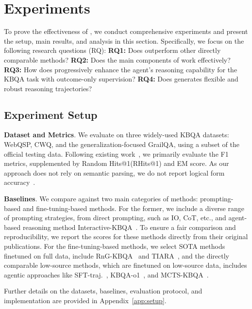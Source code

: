 \section{Experiments}\label{sec:experiment}

To prove the effectiveness of \ours, we conduct comprehensive experiments and present the setup, main results, and analysis in this section. Specifically, we focus on the following research questions (RQ): \textbf{RQ1:}
Does \ours \space outperform other directly comparable methods? \textbf{RQ2:} Does the main components of \ours \space work effectively? \textbf{RQ3:} How does \ours \space progressively enhance the agent's reasoning capability for the KBQA task with outcome-only supervision? \textbf{RQ4:} Does \ours \space generates flexible and robust reasoning trajectories?


\subsection{Experiment Setup}
\textbf{Dataset and Metrics}. We evaluate \ours \space on three widely-used KBQA datasets: WebQSP, CWQ, and the generalization-focused GrailQA, using a subset of the official testing data. Following existing work~\citep{xiong2024interactive}, we primarily evaluate the F1 metrics, supplemented by Random Hits@1(RHits@1) and EM score. As our approach does not rely on semantic parsing, we do not report logical form accuracy~\citep{gu2021beyond}. 

\textbf{Baselines}. We compare \ours \space against two main categories of methods: prompting-based and fine-tuning-based methods. For the former, we include a diverse range of prompting strategies, from direct prompting, such as IO, CoT, etc., and agent-based reasoning method Interactive-KBQA~\citep{xiong2024interactive}. To ensure a fair comparison and reproducibility, we report the scores for these methods directly from their original publications. For the fine-tuning-based methods, we select SOTA methods finetuned on full data, include RnG-KBQA~\citep{ye2022rng} and TIARA~\citep{shu2022tiara}, and the directly comparable low-source methods, which are finetuned on low-source data, includes agentic approaches like SFT-traj.~\citep{xiong2024interactive}, KBQA-o1~\citep{luokbqao1}, and MCTS-KBQA~\citep{xiong2025mcts}.

Further details on the datasets, baselines, evaluation protocol, and implementation are provided in Appendix~\ref{app:setup}.



